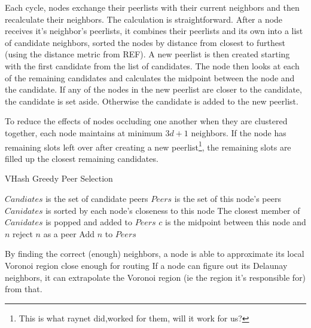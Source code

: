 \documentclass{IEEEtran}
\begin{document}
Each cycle, nodes exchange their peerlists with their current neighbors and then recalculate their neighbors.  
The calculation is straightforward.  After a node receives it's neighbor's peerlists, it combines their peerlists and its own into a list of candidate neighbors, sorted the nodes by distance from closest to furthest (using the distance metric from REF).  A new peerlist is then created starting with the first candidate from the list of candidates.  The node then looks at each of the remaining candidates and calculates the midpoint between the node and the candidate.  If any of the nodes in the new peerlist are closer to the candidate, the candidate is set aside.  Otherwise the candidate is added to the new peerlist.


To reduce the effects of nodes occluding one another when they are clustered together, each node maintains at minimum $3d+1$ neighbors.  If the node has remaining slots left over after creating a new peerlist\footnote{This is what raynet did,worked for them, will it work for us?}, the remaining slots are filled up the closest remaining candidates.


\begin{algorithm}
\caption{VHash Greedy Peer Selection}
\label{peer}
\begin{algorithmic}[1]  %
	\STATE $Candiates$ is the set of candidate peers
    \STATE $Peers$ is the set of this node's peers
    \STATE $Canidates$ is sorted by each node's closeness to this node
    \STATE The closest member of $Canidates$ is popped and added to $Peers$
    	\STATE $c$ is the midpoint between this node and $n$
        	\STATE reject $n$ as a peer
        \ELSE
        	\STATE Add $n$ to $Peers$
        \ENDIF
    \ENDFOR
\end{algorithmic}
\end{algorithm}


By finding the correct (enough) neighbors, a node is able to approximate its local Voronoi region close enough for routing
If a node can figure out its Delaunay neighbors, it can extrapolate the Voronoi region (ie the region it's responsible for) from that. 
\end{document}
